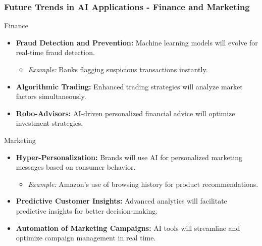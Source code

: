 \documentclass{beamer}
\begin{document}
\begin{frame}[fragile]
    \frametitle{Future Trends in AI Applications - Finance and Marketing}
    
    \begin{block}{Finance}
        \begin{itemize}
            \item \textbf{Fraud Detection and Prevention:} Machine learning models will evolve for real-time fraud detection.
            \begin{itemize}
                \item \textit{Example:} Banks flagging suspicious transactions instantly.
            \end{itemize}
            
            \item \textbf{Algorithmic Trading:} Enhanced trading strategies will analyze market factors simultaneously.
            
            \item \textbf{Robo-Advisors:} AI-driven personalized financial advice will optimize investment strategies.
        \end{itemize}
    \end{block}
    
    \begin{block}{Marketing}
        \begin{itemize}
            \item \textbf{Hyper-Personalization:} Brands will use AI for personalized marketing messages based on consumer behavior.
            \begin{itemize}
                \item \textit{Example:} Amazon’s use of browsing history for product recommendations.
            \end{itemize}
            
            \item \textbf{Predictive Customer Insights:} Advanced analytics will facilitate predictive insights for better decision-making.
            
            \item \textbf{Automation of Marketing Campaigns:} AI tools will streamline and optimize campaign management in real time.
        \end{itemize}
    \end{block}
\end{frame}
\end{document}

